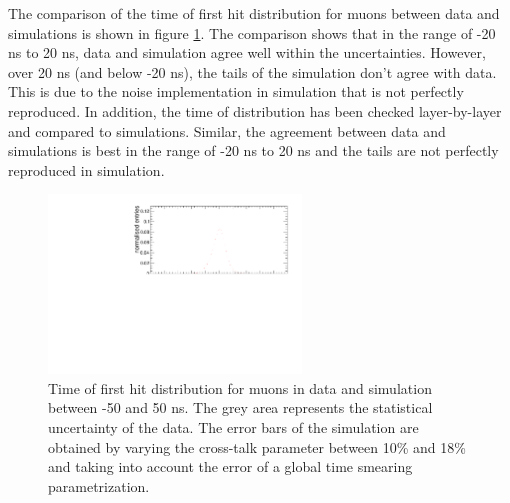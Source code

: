 The comparison of the time of first hit distribution for muons between data and simulations is shown in figure \ref{fig:sim_data_muon}. The comparison shows that in the range of -20 ns to 20 ns, data and simulation agree well within the uncertainties. However, over 20 ns (and below -20 ns), the tails of the simulation don't agree with data. This is due to the noise implementation in simulation that is not perfectly reproduced. In addition, the time of distribution has been checked layer-by-layer and compared to simulations. Similar, the agreement between data and simulations is best in the range of -20 ns to 20 ns and the tails are not perfectly reproduced in simulation.

\begin{figure}[htbp!]
	\centering
	\includegraphics[width=0.6\textwidth]{../Thesis_Plots/Timing/Muons/Plots/Comparison_MokkaDD4hepData_Muons.pdf}
	\caption{Time of first hit distribution for muons in data and simulation between -50 and 50 ns. The grey area represents the statistical uncertainty of the data. The error bars of the simulation are obtained by varying the cross-talk parameter between 10\% and 18\% and taking into account the error of a global time smearing parametrization.}
	\label{fig:sim_data_muon}
\end{figure}

